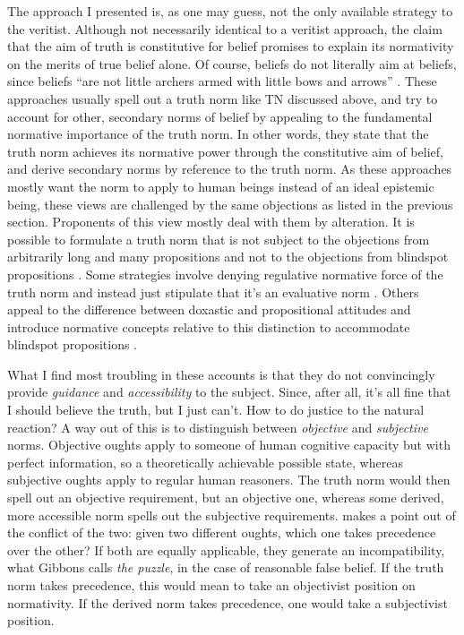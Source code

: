\documentclass[12pt,numbers=noenddot]{scrartcl}
\begin{document}
The approach I presented is, as one may guess, not the only available strategy to the veritist. Although not necessarily identical to a veritist approach, the claim that the aim of truth is constitutive for belief promises to explain its normativity on the merits of true belief alone. Of course, beliefs do not literally aim at beliefs, since beliefs “are not little archers armed with little bows and arrows” \autocite[267]{Wedgwood2002-WEDTAO}. These approaches usually spell out a truth norm like TN discussed above, and try to account for other, secondary norms of belief by appealing to the fundamental normative importance of the truth norm. In other words, they state that the truth norm achieves its normative power through the constitutive aim of belief, and derive secondary norms by reference to the truth norm. As these approaches mostly want the norm to apply to human beings instead of an ideal epistemic being, these views are challenged by the same objections as listed in the previous section. Proponents of this view mostly deal with them by alteration. It is possible to formulate a truth norm that is not subject to the objections from arbitrarily long and many propositions \autocite[159]{David2001-DAVTAT-7} and not to the objections from blindspot propositions \autocite{Greenberg2016-GREITN}. Some strategies involve denying regulative normative force of the truth norm and instead just stipulate that it's an evaluative norm \autocite{Mchugh2012-MCHTTN}. Others appeal to the difference between doxastic and propositional attitudes and introduce normative concepts relative to this distinction to accommodate blindspot propositions \autocite{Wedgwood2013-WEDTRT}. 

What I find most troubling in these accounts is that they do not convincingly provide \emph{guidance} and \emph{accessibility} to the subject. Since, after all, it's all fine that I should believe the truth, but I just can't. How to do justice to the natural reaction? A way out of this is to distinguish between \emph{objective} and \emph{subjective} norms. Objective oughts apply to someone of human cognitive capacity but with perfect information, so a theoretically achievable possible state, whereas subjective oughts apply to regular human reasoners. The truth norm would then spell out an objective requirement, but an objective one, whereas some derived, more accessible norm spells out the subjective requirements. \textcite[Ch. 2]{Gibbons2013-GIBTNO} makes a point out of the conflict of the two: given two different oughts, which one takes precedence over the other? If both are equally applicable, they generate an incompatibility, what Gibbons calls \emph{the puzzle}, in the case of reasonable false belief. If the truth norm takes precedence, this would mean to take an objectivist position on normativity. If the derived norm takes precedence, one would take a subjectivist position.
\end{document}
